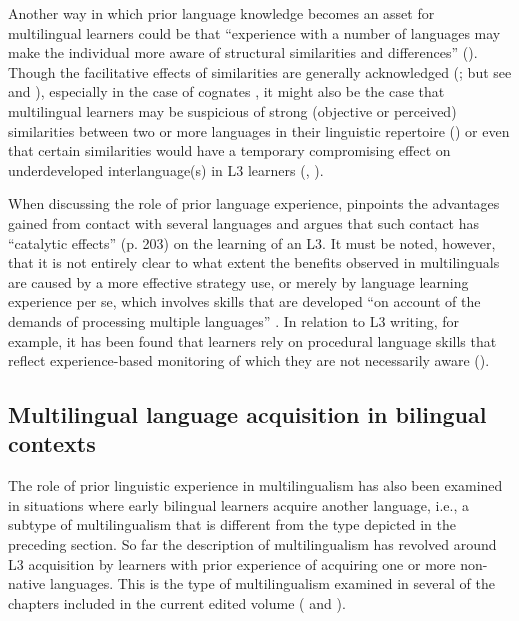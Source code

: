 \documentclass[output=paper]{../langscibook}
\begin{document}
Another way in which prior language knowledge becomes an asset for multilingual learners could be that “experience with a number of languages may make the individual more aware of structural similarities and differences” (\citealt[11]{McLaughlinNayak1989}). Though the facilitative effects of similarities are generally acknowledged (\citealt{Ringbom2007, RutgersEvans2017}; but see \citealt{SwainEtAl1990} and \citealt{GibsonEtAl2001}), especially in the case of cognates , it might also be the case that multilingual learners may be suspicious of strong (objective or perceived) similarities between two or more languages in their linguistic repertoire (\citealt{Fouser2001, OtwinowskaSzewczyk2017}) or even that certain similarities would have a temporary compromising effect on underdeveloped interlanguage(s) in L3 learners (\citealt{BardelFalk2007, Rast2010, Sánchez2012}, ).

When discussing the role of prior language experience, \citet{Jessner1999} pinpoints the advantages gained from contact with several languages and argues that such contact has “catalytic effects” (p. 203) on the learning of an L3. It must be noted, however, that it is not entirely clear to what extent the benefits observed in multilinguals are caused by a more effective strategy use, or merely by language learning experience per se, which involves skills that are developed “on account of the demands of processing multiple languages” \citep[243]{Kemp2007}. In relation to L3 writing, for example, it has been found that learners rely on procedural language skills that reflect experience-based monitoring of which they are not necessarily aware (\citealt{RutgersEvans2017}).

\subsection{Multilingual language acquisition in bilingual contexts}\label{sec:sanchez1:1.2}

The role of prior linguistic experience in multilingualism has also been examined in situations where early bilingual learners acquire another language, i.e., a subtype of multilingualism that is different from the type depicted in the preceding section. So far the description of multilingualism has revolved around L3 acquisition by learners with prior experience of acquiring one or more non-native languages. This is the type of multilingualism examined in several of the chapters included in the current edited volume (\citeauthor{chapters/gudmundson, chapters/salaberry, chapters/sanchez7, chapters/sciutti} and \citeauthor{chapters/stadt}).
\end{document}
